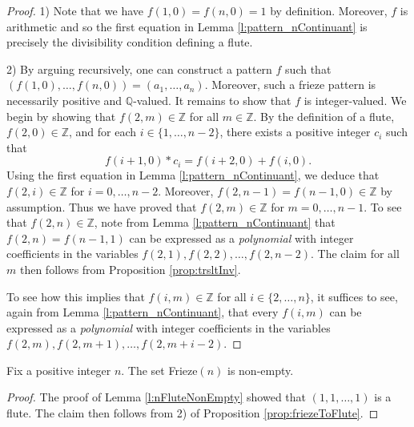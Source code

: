 \begin{proof}
    1) Note that we have $f(1,0) = f(n,0) = 1$ by definition. Moreover, $f$ is arithmetic and so the first 
    equation in Lemma \ref{l:pattern_nContinuant} is precisely the divisibility condition defining a flute.

    2) By arguing recursively, one can construct a pattern $f$ such that $ (f (1,0), \ldots, f (n,0)) = (a_1, \ldots, a_n)$. 
    Moreover, such a frieze pattern is necessarily positive and $\mathbb{Q}$-valued. It remains to show that $f$ is integer-valued. 
    We begin by showing that $f (2,m) \in \mathbb{Z}$ for all $m \in \mathbb{Z}$. 
    By the definition of a flute, $f (2,0) \in \mathbb{Z}$, and for each 
    $i \in \{1,\ldots, n-2\}$, there exists a positive integer $c_i$ such that
    \[
        f(i+1,0) * c_i = f (i+2,0) + f (i,0).    
    \]
    Using the first equation in Lemma \ref{l:pattern_nContinuant}, we deduce that $f(2,i) \in \mathbb{Z}$ for $i =0, \ldots, n-2$. 
    Moreover, $ f (2,n-1) = f (n-1,0) \in \mathbb{Z}$ by assumption. Thus we have proved that 
    $f (2,m) \in \mathbb{Z}$ for $m = 0, \ldots, n-1$. To see that $f (2,n) \in \mathbb{Z}$, note from 
    Lemma \ref{l:pattern_nContinuant} that $f (2,n) = f (n-1,1)$ can be expressed as a {\it polynomial} with 
    integer coefficients in the variables $f (2,1), f (2,2),\ldots , f (2,n-2)$. The claim for all $m$ then follows from 
    Proposition \ref{prop:trsltInv}. 

    To see how this implies that $f (i,m) \in \mathbb{Z}$ for all $i \in \{2, \ldots, n\}$, it suffices to 
    see, again from Lemma \ref{l:pattern_nContinuant}, that every $f (i,m)$ can be expressed as a {\it polynomial} with 
    integer coefficients in the variables $f (2,m), f (2,m+1),\ldots , f (2,m+i-2)$.

\end{proof}

\begin{corollary}
    \label{c:arithFriezePatSetNonEmpty}
    \leanok
    Fix a positive integer $n$. The set Frieze$(n)$ is non-empty.
\end{corollary}
\begin{proof}
    The proof of Lemma \ref{l:nFluteNonEmpty} showed that $(1,1,\ldots, 1)$ is a flute. 
    The claim then follows from 2) of Proposition \ref{prop:friezeToFlute}.
\end{proof}

